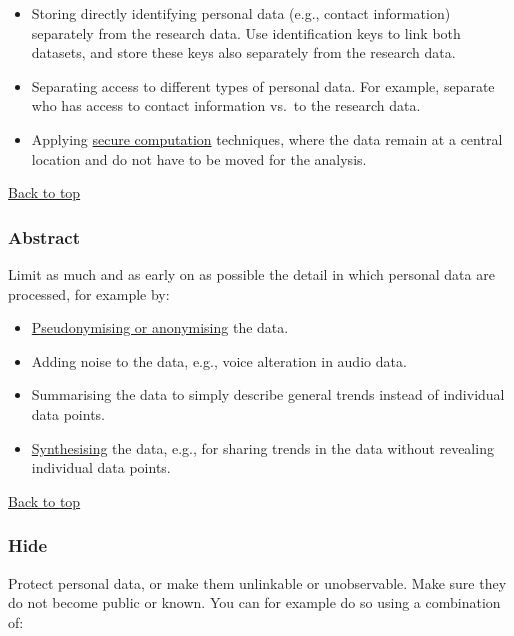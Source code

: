 \documentclass[
]{book}
\providecommand{\tightlist}{%
  \setlength{\itemsep}{0pt}\setlength{\parskip}{0pt}}
\begin{document}
\begin{itemize}
\tightlist
\item
  Storing directly identifying personal data (e.g., contact information)
  separately from the research data. Use identification keys to link both datasets,
  and store these keys also separately from the research data.
\item
  Separating access to different types of personal data. For example, separate
  who has access to contact information vs.~to the research data.
\item
  Applying \protect\hyperlink{secure-computation}{secure computation} techniques, where
  the data remain at a central location and do not have to be moved for the analysis.
\end{itemize}

\protect\hyperlink{data-oriented-strategies}{Back to top}

\hypertarget{abstract}{%
\subsubsection{\texorpdfstring{ Abstract}{ Abstract}}\label{abstract}}

Limit as much and as early on as possible the detail in which personal data
are processed, for example by:

\begin{itemize}
\tightlist
\item
  \protect\hyperlink{pseudonymisation-anonymisation}{Pseudonymising or anonymising} the data.
\item
  Adding noise to the data, e.g., voice alteration in audio data.
\item
  Summarising the data to simply describe general trends instead of individual
  data points.
\item
  \protect\hyperlink{synthetic-data}{Synthesising} the data, e.g., for sharing trends
  in the data without revealing individual data points.
\end{itemize}

\protect\hyperlink{data-oriented-strategies}{Back to top}

\hypertarget{hide}{%
\subsubsection{\texorpdfstring{ Hide}{ Hide}}\label{hide}}

Protect personal data, or make them unlinkable or unobservable. Make sure they
do not become public or known. You can for example do so using a combination of:
\end{document}
